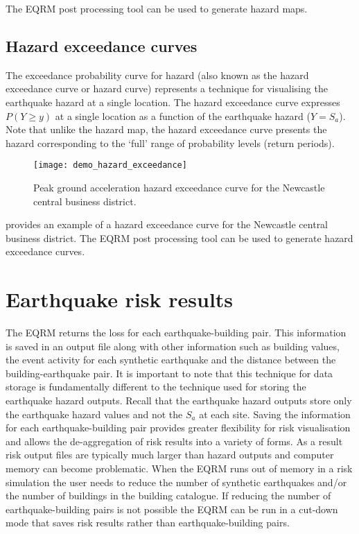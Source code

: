 The EQRM post processing tool  can
be used to generate hazard maps. 

\subsection{Hazard exceedance curves}

The exceedance probability curve for hazard (also known as the
hazard exceedance curve or hazard curve) represents a technique
for visualising the earthquake hazard at a single location. The
hazard exceedance curve expresses $P(Y \ge y)$ at a single
location as a function of the earthquake hazard ($Y = S_a$). Note
that unlike the hazard map, the hazard exceedance curve presents
the hazard corresponding to the `full' range of probability levels
(return periods).
\begin{figure}
\texttt{[image: demo\_hazard\_exceedance]}
\caption{Peak ground acceleration hazard exceedance curve for the
Newcastle central business district.}
\label{fig:risk-hzdexceedcurve}
\end{figure}
 provides an example of a hazard
exceedance curve for the Newcastle central business district. The
EQRM post processing tool  can
be used to generate hazard exceedance curves.


\section{Earthquake risk results}

The EQRM returns the loss for each earthquake-building pair. This
information is saved in an output file along with
other information such as building values, the event activity for
each synthetic earthquake and the distance between the
building-earthquake pair. It is important to note that this
technique for data storage is fundamentally different to the
technique used for storing the earthquake hazard outputs. Recall
that the earthquake hazard outputs store only the earthquake
hazard values and not the $S_a$ at each site. Saving the
information for each earthquake-building pair provides greater
flexibility for risk visualisation and allows the de-aggregation
of risk results into a variety of forms. As a result risk output
files are typically much larger than hazard outputs and computer
memory can become problematic. When the EQRM runs out of memory in
a risk simulation the user needs to reduce the number of synthetic
earthquakes and/or the number of buildings in the building
catalogue. If reducing the number of earthquake-building pairs is
not possible the EQRM can be run in a cut-down mode that saves
risk results rather than earthquake-building pairs.

